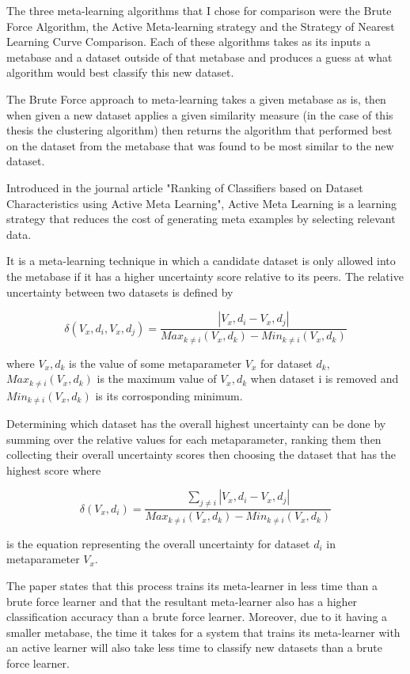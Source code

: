 \documentclass{article}
\begin{document}
The three meta-learning algorithms that I chose for comparison were the Brute
Force Algorithm, the Active Meta-learning strategy and the Strategy of Nearest
Learning Curve Comparison. Each of these algorithms takes as its inputs a
metabase and a dataset outside of that metabase and produces a guess at what
algorithm would best classify this new dataset.

The Brute Force approach to meta-learning takes a given metabase as is, then
when given a new dataset applies a given similarity measure (in the case of this
thesis the clustering algorithm) then returns the algorithm that performed
best on the dataset from the metabase that was found to be most similar to the
new dataset.

Introduced in the journal article "Ranking of Classifiers based on Dataset
Characteristics using Active Meta Learning", Active Meta Learning is a learning
strategy that reduces the cost of generating meta examples by selecting relevant
data.

It is a meta-learning technique in which a candidate dataset is only
allowed into the metabase if it has a higher uncertainty score relative to its
peers. The relative uncertainty between two datasets is defined by

$$\delta(V_x,d_i,V_x,d_j) = \frac{|V_x,d_i - V_x,d_j|}{Max_{k\neq i}(V_x,d_k)- Min_{k\neq i}(V_x,d_k)}$$

where $V_x,d_k$ is the value of some metaparameter $V_x$ for dataset $d_k$,
$Max_{k\neq i}(V_x,d_k)$ is the maximum value of $V_x,d_k$ when dataset i is
removed and $Min_{k\neq i}(V_x,d_k)$ is its corrosponding minimum.

Determining which dataset has the overall highest uncertainty can be done by
summing over the relative values for each metaparameter, ranking them then
collecting their overall uncertainty scores then choosing the dataset that has
the highest score where

$$\delta(V_x,d_i) = \frac{\sum_{j\neq i} |V_x,d_i - V_x,d_j|}{Max_{k\neq i}(V_x,d_k)- Min_{k\neq i}(V_x,d_k)}$$

is the equation representing the overall uncertainty for dataset
$d_i$ in metaparameter $V_x$.

The paper states that this process trains its meta-learner in less time than
a brute force learner and that the resultant meta-learner also has a higher
classification accuracy than a brute force learner. Moreover, due to it having
a smaller metabase, the time it takes for a system that trains its meta-learner
with an active learner will also take less time to classify new datasets than
a brute force learner.
\end{document}
